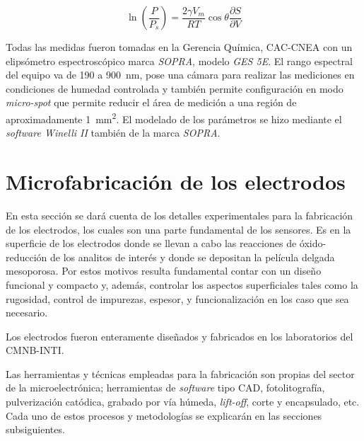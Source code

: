 			\begin{equation}
			  	 \ln \left(\frac{P}{P_s}\right)=\frac{2\gamma V_m}{RT} \cos{\theta}\frac{\partial S}{\partial V}
			     \label{eq:kelvin}
			 	 \end{equation}					
	
		Todas las medidas fueron tomadas en la Gerencia Química, CAC-CNEA con un elipsómetro espectroscópico marca \textit{SOPRA}, modelo \textit{GES 5E}. El rango espectral del equipo va de 190 a \SI{900}{\nm}, pose una cámara para realizar las mediciones en condiciones de humedad controlada y también permite configuración en modo \textit{micro-spot} que permite reducir el área de medición a una región de aproximadamente \SI{1}{\mm^2}. El modelado de los parámetros se hizo mediante el \textit{software Winelli II} también de la marca \textit{SOPRA}.
			

\section{Microfabricación de los electrodos}
		
	 En esta sección se dará cuenta de los detalles experimentales para la fabricación de los electrodos, los cuales son una parte fundamental de los sensores. Es en la superficie de los electrodos donde se llevan a cabo las reacciones de óxido-reducción de los analitos de interés y donde se depositan la película delgada mesoporosa. Por estos motivos resulta fundamental contar con un diseño funcional y compacto y, además, controlar los aspectos superficiales tales como la rugosidad, control de impurezas, espesor, y funcionalización en los caso que sea necesario.

	 Los electrodos fueron enteramente diseñados y fabricados en los laboratorios del CMNB-INTI. 
		
	 Las herramientas y técnicas empleadas para la fabricación son propias del sector de la microelectrónica; herramientas de \textit{software} tipo CAD, fotolitografía, pulverización catódica, grabado por vía húmeda, \textit{lift-off}, corte y encapsulado, etc.\cite{Franssila2004,Jaeger2001} Cada uno de estos procesos y metodologías se explicarán en las secciones subsiguientes. 

